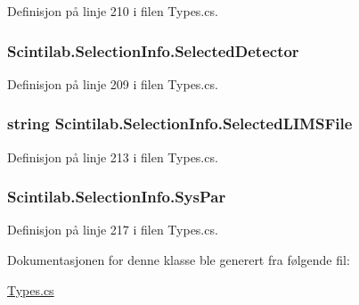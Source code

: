 Definisjon på linje 210 i filen Types.\+cs.

\hypertarget{class_scintilab_1_1_selection_info_aba0448eddbfd3ea7d133a4a7410e593a}{
\subsubsection[{Selected\+Detector}]{ Scintilab.\+Selection\+Info.\+Selected\+Detector}}\label{class_scintilab_1_1_selection_info_aba0448eddbfd3ea7d133a4a7410e593a}


Definisjon på linje 209 i filen Types.\+cs.

\hypertarget{class_scintilab_1_1_selection_info_abb0c8ee7bd5b11a26c2d3faa2f358052}{
\subsubsection[{Selected\+L\+I\+M\+S\+File}]{\setlength{\rightskip}{0pt plus 5cm}string Scintilab.\+Selection\+Info.\+Selected\+L\+I\+M\+S\+File}}\label{class_scintilab_1_1_selection_info_abb0c8ee7bd5b11a26c2d3faa2f358052}


Definisjon på linje 213 i filen Types.\+cs.

\hypertarget{class_scintilab_1_1_selection_info_a33bd5eca362c1934f22832481248d19d}{
\subsubsection[{Sys\+Par}]{ Scintilab.\+Selection\+Info.\+Sys\+Par}}\label{class_scintilab_1_1_selection_info_a33bd5eca362c1934f22832481248d19d}


Definisjon på linje 217 i filen Types.\+cs.



Dokumentasjonen for denne klasse ble generert fra følgende fil\+:\begin{DoxyCompactItemize}
\item 
\hyperlink{_types_8cs}{Types.\+cs}\end{DoxyCompactItemize}
